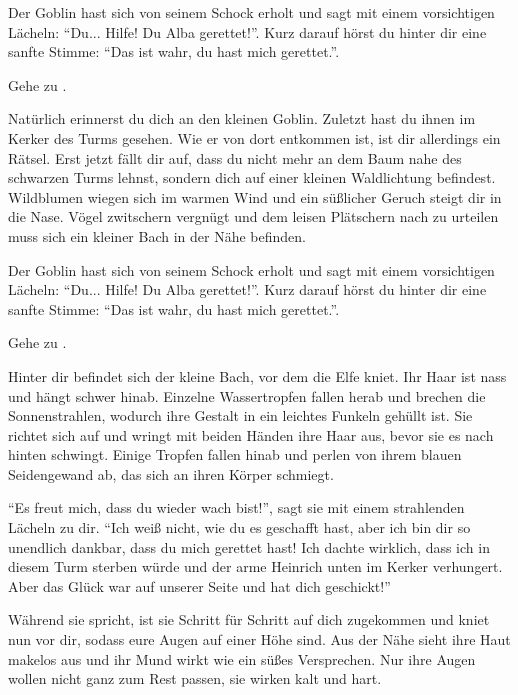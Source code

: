 Der Goblin hast sich von seinem Schock erholt und sagt mit einem vorsichtigen Lächeln: ``Du... Hilfe! Du Alba gerettet!''. Kurz darauf hörst du hinter dir eine sanfte Stimme: ``Das ist wahr, du hast mich gerettet.''.

Gehe zu .


Natürlich erinnerst du dich an den kleinen Goblin.
Zuletzt hast du ihnen im Kerker des Turms gesehen.
Wie er von dort entkommen ist, ist dir allerdings ein Rätsel.
Erst jetzt fällt dir auf, dass du nicht mehr an dem Baum nahe des schwarzen Turms lehnst, sondern dich auf einer kleinen Waldlichtung befindest.
Wildblumen wiegen sich im warmen Wind und ein süßlicher Geruch steigt dir in die Nase. Vögel zwitschern vergnügt und dem leisen Plätschern nach zu urteilen muss sich ein kleiner Bach in der Nähe befinden.

Der Goblin hast sich von seinem Schock erholt und sagt mit einem vorsichtigen Lächeln: ``Du... Hilfe! Du Alba gerettet!''. Kurz darauf hörst du hinter dir eine sanfte Stimme: ``Das ist wahr, du hast mich gerettet.''.

Gehe zu .


Hinter dir befindet sich der kleine Bach, vor dem die Elfe kniet. Ihr Haar ist nass und hängt schwer hinab. Einzelne Wassertropfen fallen herab und brechen die Sonnenstrahlen, wodurch ihre Gestalt in ein leichtes Funkeln gehüllt ist. Sie richtet sich auf und wringt mit beiden Händen ihre Haar aus, bevor sie es nach hinten schwingt. Einige Tropfen fallen hinab und perlen von ihrem blauen Seidengewand ab, das sich an ihren Körper schmiegt.

``Es freut mich, dass du wieder wach bist!'', sagt sie mit einem strahlenden Lächeln zu dir.
``Ich weiß nicht, wie du es geschafft hast, aber ich bin dir so unendlich dankbar, dass du mich gerettet hast! Ich dachte wirklich, dass ich in diesem Turm sterben würde und der arme Heinrich unten im Kerker verhungert. Aber das Glück war auf unserer Seite und hat dich geschickt!''

Während sie spricht, ist sie Schritt für Schritt auf dich zugekommen und kniet nun vor dir, sodass eure Augen auf einer Höhe sind.
Aus der Nähe sieht ihre Haut makelos aus und ihr Mund wirkt wie ein süßes Versprechen.
Nur ihre Augen wollen nicht ganz zum Rest passen, sie wirken kalt und hart.

